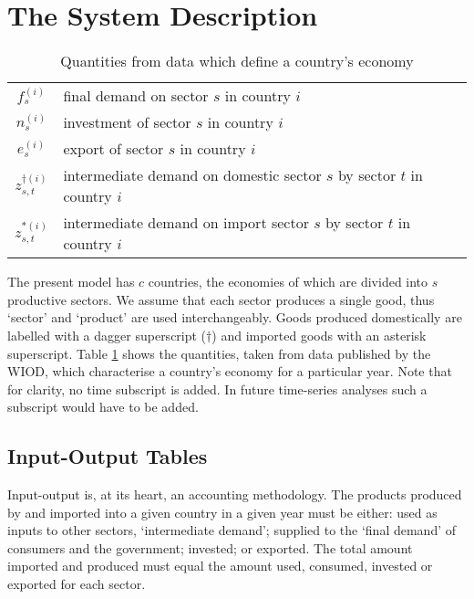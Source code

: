 \documentclass[a4paper]{article}
\begin{document}
\section{The System Description} \label{sec:system}
\begin{table}
\begin{center}
\begin{tabular}{cl}\toprule
$f_s^{(i)}$ & final demand on sector $s$ in country $i$\\
$n_s^{(i)}$ & investment of sector $s$ in country $i$\\
$e_s^{(i)}$ & export of sector $s$ in country $i$\\
$z_{s,t}^{\dagger(i)}$ & intermediate demand on domestic sector $s$ by sector $t$ in country $i$\\
$z_{s,t}^{*(i)}$ & intermediate demand on import sector $s$ by sector $t$ in country $i$\\\bottomrule
\end{tabular}
\end{center}
\caption{Quantities from data which define a country's economy}\label{tbl:cvars}
\end{table}

The present model has $c$ countries, the economies of which are divided into $s$ productive sectors.
We assume that each sector produces a single good, thus `sector' and `product' are used interchangeably. 
Goods produced domestically are labelled with a dagger superscript ($\dagger$) and imported goods with an asterisk superscript.
Table \ref{tbl:cvars} shows the quantities, taken from data published by the WIOD, which characterise a country's economy for a particular year.
Note that for clarity, no time subscript is added. In future time-series analyses such a subscript would have to be added.

\subsection{Input-Output Tables} \label{sec:iots}
Input-output is, at its heart, an accounting methodology.
The products produced by and imported into a given country in a given year must be either: used as inputs to other sectors, `intermediate demand'; supplied to the `final demand' of consumers and the government; invested; or exported.
The total amount imported and produced must equal the amount used, consumed, invested or exported for each sector.
\end{document}
